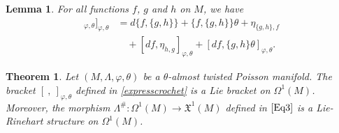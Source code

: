 \documentclass[10pt,a4paper]{amsart}
\newtheorem{lemma}{Lemma}
\newtheorem{theorem}{Theorem}
\begin{document}
		\begin{lemma}\label{lem2} For all  functions $f$, $g$ and $h$   on $M$, we have
			\begin{align*}
				[df,[dg,dh]_{\varphi,\theta}]_{\varphi,\theta} & =d\{f,\{g,h\}\}+\{f,\{g,h\}\}\theta+\eta_{\{g,h\},f}\\
				&\quad+[df,\eta_{h,g}]_{\varphi,\theta}+[df,\{g,h\}\theta]_{\varphi,\theta}.
			\end{align*}	
		\end{lemma}

		\begin{theorem}\label{prop3}
			Let $(M,\Lambda,\varphi,\theta)$ be a $\theta$-almost twisted Poisson manifold. The bracket $[\ ,\ ]_{\varphi,\theta}$ defined in \eqref{expresscrochet} is  a  Lie bracket on $\Omega^1(M)$. Moreover, the morphism  $\Lambda^{\#} :\Omega^1(M)\longrightarrow \mathfrak{X}^1(M)$ defined  in $\eqref{Eq3}$ is  a Lie-Rinehart  structure on $\Omega^1(M)$.
		\end{theorem}
\end{document}
